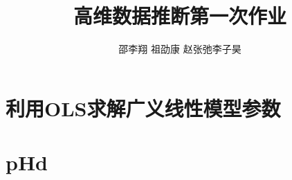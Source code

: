 \documentclass[cn,11pt]{elegantpaper}
\title{高维数据推断第一次作业}
\author{邵李翔 \quad 祖劭康 \quad 赵张弛\quad 李子昊}
\date{}
\begin{document}
    


\maketitle
\newpage
\tableofcontents

\newpage
\section{利用OLS求解广义线性模型参数}



\section{pHd}

%  

%  
\end{document}
